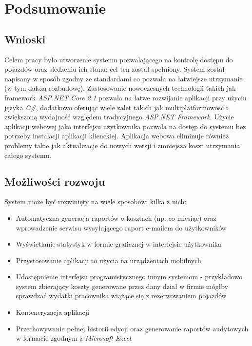 \documentclass[eng,printmode,openany]{mgr}
\begin{document}
	\newpage
	\chapter{Podsumowanie}
	\section{Wnioski}
	Celem pracy było utworzenie systemu pozwalającego na kontrolę dostępu do pojazdów oraz śledzeniu ich stanu; cel ten został spełniony. System został napisany w sposób zgodny ze standardami co pozwala na łatwiejsze utrzymanie (w tym dalszą rozbudowę). Zastosowanie nowoczesnych technologii takich jak framework \textit{ASP.NET Core 2.1} pozwala na łatwe rozwijanie aplikacji przy użyciu języka \textit{C\#}, dodatkowo oferując wiele zalet takich jak multiplatformowość i zwiększoną wydajność względem tradycyjnego \textit{ASP.NET Framework}. Użycie aplikacji webowej jako interfejsu użytkownika pozwala na dostęp do systemu bez potrzeby instalacji aplikacji klienckiej. Aplikacja webowa eliminuje również problemy takie jak aktualizacje do nowych wersji i zmniejsza koszt utrzymania całego systemu.
	
	\section{Możliwości rozwoju}
	System może być rozwinięty na wiele sposobów; kilka z nich:
	\begin{itemize}
		\item Automatyczna generacja raportów o kosztach (np. co miesiąc) oraz wprowadzenie serwisu wysyłającego raport e-mailem do użytkowników 
		\item Wyświetlanie statystyk w formie graficznej w interfejsie użytkownika
		\item Przystosowanie aplikacji to użycia na urządzeniach mobilnych
		\item Udostępnienie interfejsu programistycznego innym systemom - przykładowo system zbierający koszty generowane przez dany dział w firmie mógłby sprawdzać wydatki pracownika wiążące się z rezerwowaniem pojazdów
		\item Konteneryzacja aplikacji
		\item Przechowywanie pełnej historii edycji oraz generowanie raportów audytowych w formacie zgodnym z \textit{Microsoft Excel}.
	\end{itemize}
	
\end{document}
